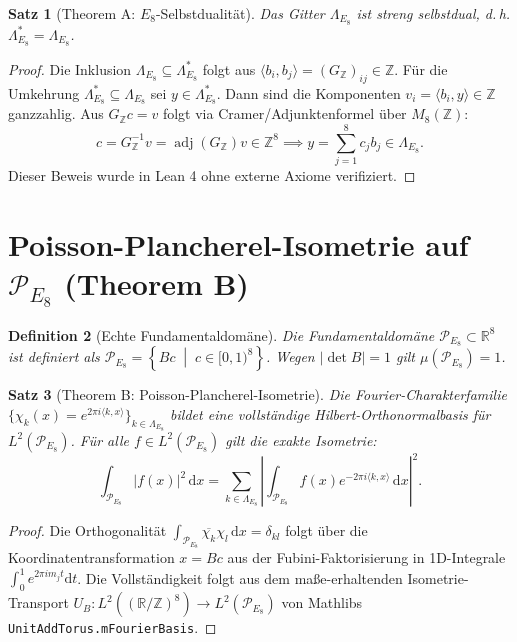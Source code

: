 \documentclass[11pt,a4paper]{article}
\newtheorem{theorem}{Satz}[section]
\newtheorem{definition}[theorem]{Definition}
\begin{document}
	\begin{theorem}[Theorem A: $E_8$-Selbstdualität]
		\label{thm:self_duality}
		Das Gitter $\Lambda_{E_8}$ ist streng selbstdual, d.\,h. $\Lambda_{E_8}^* = \Lambda_{E_8}$.
	\end{theorem}
	
	\begin{proof}
		Die Inklusion $\Lambda_{E_8} \subseteq \Lambda_{E_8}^*$ folgt aus $\langle b_i, b_j \rangle = (G_{\mathbb{Z}})_{ij} \in \mathbb{Z}$. Für die Umkehrung $\Lambda_{E_8}^* \subseteq \Lambda_{E_8}$ sei $y \in \Lambda_{E_8}^*$. Dann sind die Komponenten $v_i = \langle b_i, y \rangle \in \mathbb{Z}$ ganzzahlig. Aus $G_{\mathbb{Z}} c = v$ folgt via Cramer/Adjunktenformel über $M_8(\mathbb{Z})$:
		\begin{equation}
			c = G_{\mathbb{Z}}^{-1} v = \operatorname{adj}(G_{\mathbb{Z}}) v \in \mathbb{Z}^8 \implies y = \sum_{j=1}^8 c_j b_j \in \Lambda_{E_8}.
		\end{equation}
		Dieser Beweis wurde in Lean 4 ohne externe Axiome verifiziert.
	\end{proof}
	
	\section{Poisson-Plancherel-Isometrie auf $\mathcal{P}_{E_8}$ (Theorem B)}
	
	\begin{definition}[Echte Fundamentaldomäne]
		Die Fundamentaldomäne $\mathcal{P}_{E_8} \subset \mathbb{R}^8$ ist definiert als $\mathcal{P}_{E_8} = \left\{ B c \;\middle|\; c \in [0,1)^8 \right\}$. Wegen $|\det B| = 1$ gilt $\mu(\mathcal{P}_{E_8}) = 1$.
	\end{definition}
	
	\begin{theorem}[Theorem B: Poisson-Plancherel-Isometrie]
		Die Fourier-Charakterfamilie $\{\chi_k(x) = e^{2\pi i \langle k, x \rangle}\}_{k \in \Lambda_{E_8}}$ bildet eine vollständige Hilbert-Orthonormalbasis für $L^2(\mathcal{P}_{E_8})$. Für alle $f \in L^2(\mathcal{P}_{E_8})$ gilt die exakte Isometrie:
		\begin{equation}
			\int_{\mathcal{P}_{E_8}} |f(x)|^2 \, \mathrm{d}x = \sum_{k \in \Lambda_{E_8}} \left| \int_{\mathcal{P}_{E_8}} f(x) e^{-2\pi i \langle k, x \rangle} \, \mathrm{d}x \right|^2.
		\end{equation}
	\end{theorem}
	
	\begin{proof}
		Die Orthogonalität $\int_{\mathcal{P}_{E_8}} \overline{\chi_k} \chi_l \, \mathrm{d}x = \delta_{kl}$ folgt über die Koordinatentransformation $x = B c$ aus der Fubini-Faktorisierung in 1D-Integrale $\int_0^1 e^{2\pi i m_j t} \mathrm{d}t$. Die Vollständigkeit folgt aus dem maße-erhaltenden Isometrie-Transport $U_B: L^2((\mathbb{R}/\mathbb{Z})^8) \to L^2(\mathcal{P}_{E_8})$ von Mathlibs \texttt{UnitAddTorus.mFourierBasis}.
	\end{proof}
	
\end{document}
